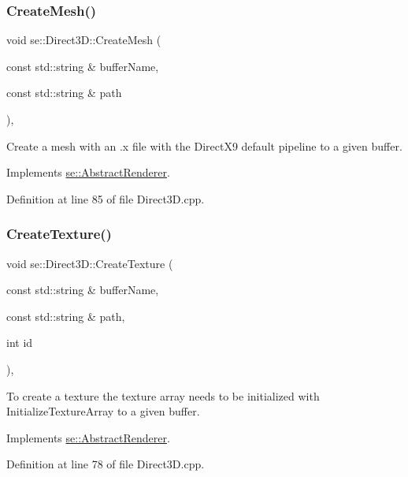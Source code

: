 \subsubsection{\texorpdfstring{Create\+Mesh()}{CreateMesh()}}
{\footnotesize\ttfamily void se\+::\+Direct3\+D\+::\+Create\+Mesh (\begin{DoxyParamCaption}\item[{const std\+::string \&}]{buffer\+Name,  }\item[{const std\+::string \&}]{path }\end{DoxyParamCaption})\hspace{0.3cm}{\ttfamily [override]}, {\ttfamily [virtual]}}

Create a mesh with an .x file with the Direct\+X9 default pipeline to a given buffer. 

Implements \mbox{\hyperlink{classse_1_1_abstract_renderer_a4a3e8836f7a8b1b35a5f7cb1b4231476}{se\+::\+Abstract\+Renderer}}.



Definition at line 85 of file Direct3\+D.\+cpp.

\mbox{\label{classse_1_1_direct3_d_a33c350a77a959847d3571e14feb72c85}} 
\subsubsection{\texorpdfstring{Create\+Texture()}{CreateTexture()}}
{\footnotesize\ttfamily void se\+::\+Direct3\+D\+::\+Create\+Texture (\begin{DoxyParamCaption}\item[{const std\+::string \&}]{buffer\+Name,  }\item[{const std\+::string \&}]{path,  }\item[{int}]{id }\end{DoxyParamCaption})\hspace{0.3cm}{\ttfamily [override]}, {\ttfamily [virtual]}}

To create a texture the texture array needs to be initialized with Initialize\+Texture\+Array to a given buffer. 

Implements \mbox{\hyperlink{classse_1_1_abstract_renderer_a89f2efd2ee68cfb6735e51ce87206dfd}{se\+::\+Abstract\+Renderer}}.



Definition at line 78 of file Direct3\+D.\+cpp.

